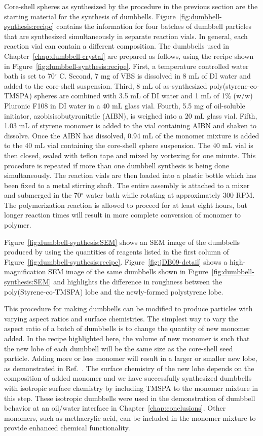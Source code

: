 Core-shell spheres as synthesized by the procedure in the previous section are the starting material for the synthesis of dumbbells.
Figure~\ref{fig:dumbbell-synthesis:recipe} contains the information for four batches of dumbbell particles that are synthesized simultaneously in separate reaction vials.
In general, each reaction vial can contain a different composition.
The dumbbells used in Chapter~\ref{chap:dumbbell-crystal} are prepared as follows, using the recipe shown in Figure~\ref{fig:dumbbell-synthesis:recipe}.
First, a temperature controlled water bath is set to 70$^\circ$ C.
Second, 7 mg of VBS is dissolved in 8 mL of DI water and added to the core-shell suspension.
Third, 8 mL of as-synthesized poly(styrene-co-TMSPA) spheres are combined with 3.5 mL of DI water and 1 mL of 1\% (w/w) Pluronic F108 in DI water in a 40 mL glass vial.
Fourth, 5.5 mg of oil-soluble initiator,  azobisisobutyronitrile (AIBN), is weighed into a 20 mL glass vial.
Fifth, 1.03 mL of styrene monomer is added to the vial containing AIBN and shaken to dissolve.
Once the AIBN has dissolved, 0.94 mL of the monomer mixture is added to the 40 mL vial containing the core-shell sphere suspension.
The 40 mL vial is then closed, sealed with teflon tape and mixed by vortexing for one minute.
This procedure is repeated if more than one dumbbell synthesis is being done simultaneously.
The reaction vials are then loaded into a plastic bottle which has been fixed to a metal stirring shaft.
The entire assembly is attached to a mixer and submerged in the 70$^\circ$ water bath while rotating at approximately 300 RPM.
The polymerization reaction is allowed to proceed for at least eight hours, but longer reaction times will result in more complete conversion of monomer to polymer.

Figure~\ref{fig:dumbbell-synthesis:SEM} shows an SEM image of the dumbbells produced by using the quantities of reagents listed in the first column of Figure~\ref{fig:dumbbell-synthesis:recipe}.
Figure~\ref{fig:jDB09-detail} shows a high-magnification SEM image of the same dumbbells shown in Figure~\ref{fig:dumbbell-synthesis:SEM} and highlights the difference in roughness between the poly(Styrene-co-TMSPA) lobe and the newly-formed polystyrene lobe.

This procedure for making dumbbells can be modified to produce particles with varying aspect ratios and surface chemistries.
The simplest way to vary the aspect ratio of a batch of dumbbells is to change the quantity of new monomer added.
In the recipe highlighted here, the volume of new monomer is such that the new lobe of each dumbbell will be the same size as the core-shell seed particle.
Adding more or less monomer will result in a larger or smaller new lobe, as demonstrated in Ref.~\cite{Park2010}.
The surface chemistry of the new lobe depends on the composition of added monomer and we have successfully synthesized dumbbells with isotropic surface chemistry by including TMSPA to the monomer mixture in this step.
These isotropic dumbbells were used in the demonstration of dumbbell behavior at an oil/water interface in Chapter~\ref{chap:conclusions}.
Other monomers, such as methacrylic acid, can be included in the monomer mixture to provide enhanced chemical functionality.

